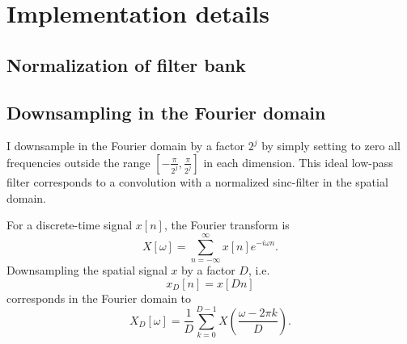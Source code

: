 \documentclass[twocolumn, openany, twoside, article]{memoir}
\begin{document}
\chapter{Implementation details}

\section{Normalization of filter bank}

\section{Downsampling in the Fourier domain}
I downsample in the Fourier domain by a factor $2^j$ by simply setting to zero all frequencies
outside the range $[-\frac{\pi}{2^j}, \frac{\pi}{2^j}]$ in each dimension. This ideal low-pass filter corresponds to a
convolution with a normalized sinc-filter in the spatial domain.

For a discrete-time signal $x[n]$, the Fourier transform is
\begin{equation}
  X[\omega] = \sum_{n = -\infty}^{\infty} x[n] e^{-i\omega n}.
\end{equation}
Downsampling the spatial signal $x$ by a factor $D$, i.e.
\begin{equation}
  x_D[n] = x[Dn]
\end{equation}
corresponds in the Fourier domain to
\begin{equation}
  X_D[\omega] = \frac{1}{D}\sum_{k=0}^{D-1}X(\frac{\omega - 2 \pi k}{D}).
\end{equation}





\printbibliography
\end{document}

